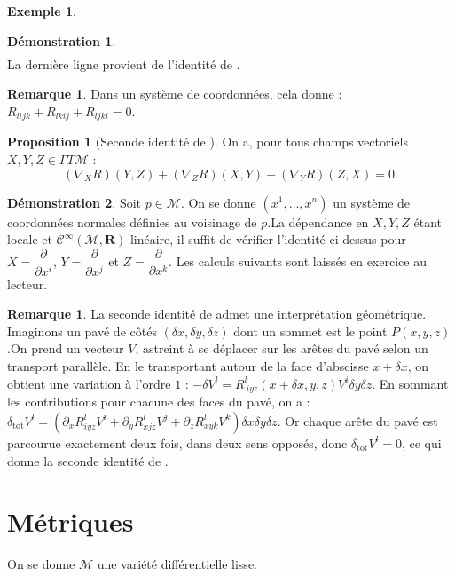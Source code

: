\documentclass[12pt,a4paper]{article}
\theoremstyle{definition}
\newtheorem{prop}[thm]{Proposition}
\newtheorem{ex}[thm]{Exemple}
\newtheorem{rqe}[thm]{Remarque}
\newtheorem*{dem}{Démonstration}
\begin{document}
\begin{ex}
\begin{dem}
\begin{align*}
\end{align*}
La dernière ligne provient de l'identité de .
\end{dem}
\begin{rqe}
Dans un système de coordonnées, cela donne : $R_{lijk}+R_{lkij}+R_{ljki}=0$.
\end{rqe}
\begin{prop}[Seconde identité de ]
On a, pour tous champs vectoriels $X,Y,Z\in\Gamma T\mathcal{M}$ :
$$
(\nabla_X R)(Y,Z)+(\nabla_Z R)(X,Y)+(\nabla_Y R)(Z,X)=0.
$$
\end{prop}
\begin{dem}
Soit $p\in\mathcal{M}$. On se donne $(x^1,\ldots,x^n)$ un système de coordonnées normales définies au voisinage de $p$.\newline La dépendance en $X,Y,Z$ étant locale et $\mathcal{C}^\infty(\mathcal{M},\mathbf{R})$-linéaire, il suffit de vérifier l'identité ci-dessus pour $X=\dfrac{\partial}{\partial x^i}$, $Y=\dfrac{\partial}{\partial x^j}$ et $Z=\dfrac{\partial}{\partial x^k}$. Les calculs suivants sont laissés en exercice au lecteur.
\end{dem}
\begin{rqe}
La seconde identité de  admet une interprétation géométrique. Imaginons un pavé de côtés $(\delta x,\delta y,\delta z)$ dont un sommet est le point $P(x,y,z)$.\newline On prend un vecteur $V$, astreint à se déplacer sur les arêtes du pavé selon un transport parallèle. En le transportant autour de la face d'abscisse $x+\delta x$, on obtient une variation à l'ordre $1$ : $-\delta V^l=R^l_{~iyz}(x+\delta x,y,z)V^i\delta y\delta z$. En sommant les contributions pour chacune des faces du pavé, on a : $\delta_{\text{tot}} V^l=\left(\partial_x R^l_{iyz}V^i+\partial_y R^l_{xjz}V^j+\partial_z R^l_{xyk}V^k\right)\delta x\delta y\delta z$. Or chaque arête du pavé est parcourue exactement deux fois, dans deux sens opposés, donc $\delta_{\text{tot}} V^l=0$, ce qui donne la seconde identité de .
\end{rqe}
\newpage
\section{Métriques}
On se donne $\mathcal{M}$ une variété différentielle lisse.

\end{ex}
\end{document}
